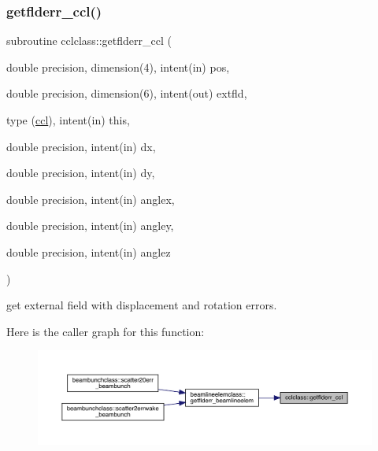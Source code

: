 \subsubsection{\texorpdfstring{getflderr\_ccl()}{getflderr\_ccl()}}
{\footnotesize\ttfamily subroutine cclclass\+::getflderr\+\_\+ccl (\begin{DoxyParamCaption}\item[{double precision, dimension(4), intent(in)}]{pos,  }\item[{double precision, dimension(6), intent(out)}]{extfld,  }\item[{type (\mbox{\hyperlink{namespacecclclass_structcclclass_1_1ccl}{ccl}}), intent(in)}]{this,  }\item[{double precision, intent(in)}]{dx,  }\item[{double precision, intent(in)}]{dy,  }\item[{double precision, intent(in)}]{anglex,  }\item[{double precision, intent(in)}]{angley,  }\item[{double precision, intent(in)}]{anglez }\end{DoxyParamCaption})}



get external field with displacement and rotation errors. 

Here is the caller graph for this function\+:\nopagebreak
\begin{figure}[H]
\begin{center}
\leavevmode
\includegraphics[width=350pt]{namespacecclclass_a4d8386891ff89c7352f001b01d5f84b5_icgraph}
\end{center}
\end{figure}
\mbox{\label{namespacecclclass_a22dde155eb6d5e19ccedbe59cd955580}} 
